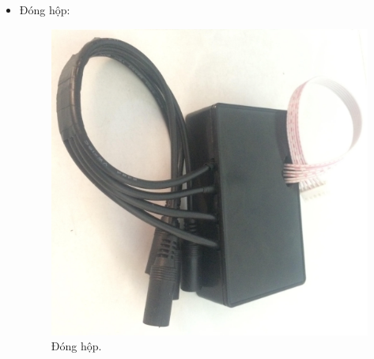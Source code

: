 \documentclass[a4paper,12pt,oneside]{article}
\begin{document}
\begin{itemize}
\item Đóng hộp:
	\begin{figure}[H]
	\centering
	\includegraphics[scale=.15]{hinh/relay_box.jpg}
	\caption{Đóng hộp.}
	\end{figure}
\end{itemize}
\end{document}
